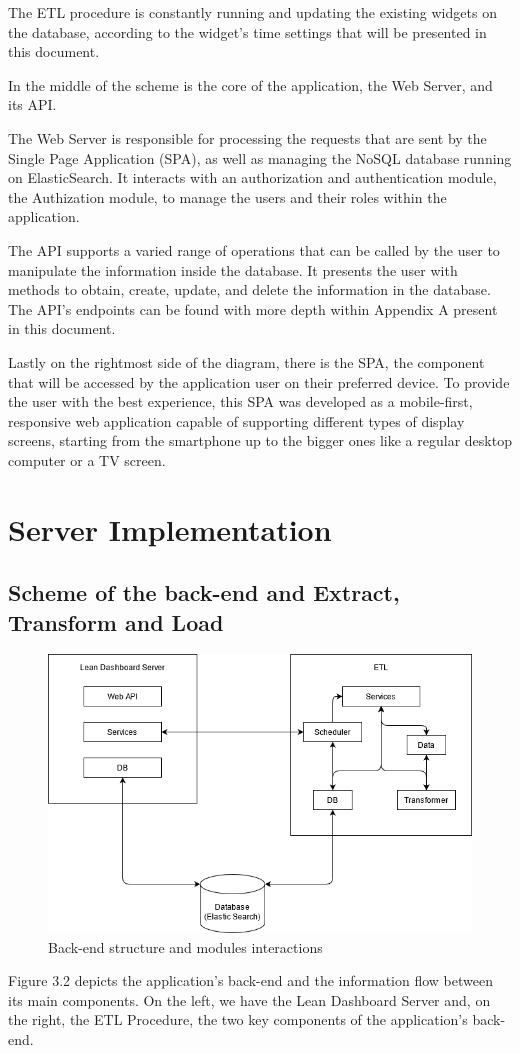 \documentclass[a4paper,twoside,10pt]{report}
\begin{document}
The ETL procedure is constantly running and updating the existing widgets on the database, according to the widget's time settings that will be presented in this document.

In the middle of the scheme is the core of the application, the Web Server, and its API.

The Web Server is responsible for processing the requests that are sent by the Single Page Application (SPA), as well as managing the NoSQL database running on ElasticSearch\cite{ES}.
It interacts with an authorization and authentication module, the Authization module, to manage the users and their roles within the application.

The API supports a varied range of operations that can be called by the user to manipulate the information inside the database. It presents the user with methods to obtain, create, update, and delete the information in the database.
The API's endpoints can be found with more depth within Appendix A present in this document.

Lastly on the rightmost side of the diagram, there is the SPA, the component that will be accessed by the application user on their preferred device. To provide the user with the best experience, this SPA was developed as a mobile-first, responsive web application capable of supporting different types of display screens, starting from the smartphone up to the bigger ones like a regular desktop computer or a TV screen.

\chapter{Server Implementation}
\section{Scheme of the back-end and Extract, Transform and Load}
\begin{figure}[h!]
\center
  \includegraphics[width=\textwidth]{arquitetura software.png}
  \caption{Back-end structure and modules interactions}
\end{figure}
Figure 3.2 depicts the application's back-end and the information flow between its main components. On the left, we have the Lean Dashboard Server and, on the right, the ETL Procedure, the two key components of the application's back-end.
\end{document}
